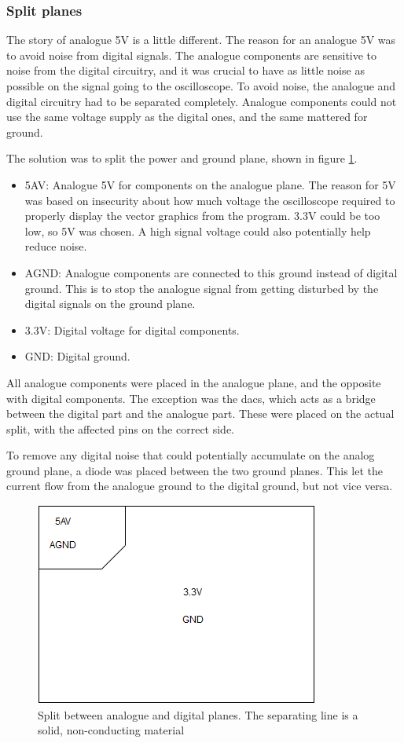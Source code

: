 \subsubsection{Split planes}
The story of analogue 5V is a little different.
The reason for an analogue 5V was to avoid noise from digital signals.
The analogue components are sensitive to noise from the digital circuitry, and it was crucial to have as little noise as possible on the signal going to the oscilloscope.
To avoid noise, the analogue and digital circuitry had to be separated completely.
Analogue components could not use the same voltage supply as the digital ones, and the same mattered for ground.

The solution was to split the power and ground plane, shown in figure \ref{fig:Split planes}.
\begin{itemize}
\item 5AV: Analogue 5V for components on the analogue plane.
The reason for 5V was based on insecurity about how much voltage the oscilloscope required to properly display the vector graphics from the program.
3.3V could be too low, so 5V was chosen.
A high signal voltage could also potentially help reduce noise.
\item AGND: Analogue components are connected to this ground instead of digital ground.
This is to stop the analogue signal from getting disturbed by the digital signals on the ground plane.
\item 3.3V: Digital voltage for digital components.
\item GND: Digital ground.
\end{itemize}

All analogue components were placed in the analogue plane, and the opposite with digital components.
The exception was the \gls{dac}s, which acts as a bridge between the digital part and the analogue part.
These were placed on the actual split, with the affected pins on the correct side.

To remove any digital noise that could potentially accumulate on the analog ground plane, a diode was placed between the two ground planes.
This let the current flow from the analogue ground to the digital ground, but not vice versa.

\begin{figure}[h!]
\centering
\includegraphics[scale = 0.6]{images/Split_planes.png}
\caption{Split between analogue and digital planes. The separating line is a solid, non-conducting material}
\label{fig:Split planes}
\end{figure}

